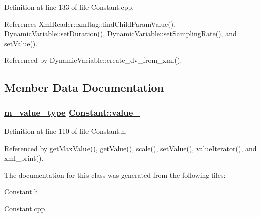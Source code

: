Definition at line 133 of file Constant.cpp.

References Xml\-Reader::xmltag::find\-Child\-Param\-Value(), Dynamic\-Variable::set\-Duration(), Dynamic\-Variable::set\-Sampling\-Rate(), and set\-Value().

Referenced by Dynamic\-Variable::create\_\-dv\_\-from\_\-xml().

\subsection{Member Data Documentation}
\hypertarget{classConstant_r0}{
\subsubsection[value\_\-]{\setlength{\rightskip}{0pt plus 5cm}\hyperlink{Types_8h_a3}{m\_\-value\_\-type} \hyperlink{classConstant_r0}{Constant::value\_\-}}}
\label{classConstant_r0}




Definition at line 110 of file Constant.h.

Referenced by get\-Max\-Value(), get\-Value(), scale(), set\-Value(), value\-Iterator(), and xml\_\-print().

The documentation for this class was generated from the following files:\begin{CompactItemize}
\item 
\hyperlink{Constant_8h}{Constant.h}\item 
\hyperlink{Constant_8cpp}{Constant.cpp}\end{CompactItemize}
